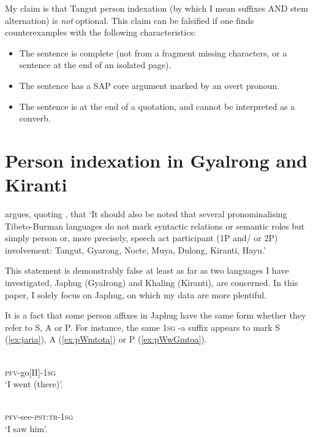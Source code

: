 \documentclass[oldfontcommands,oneside,a4paper,11pt]{article}
\newcommand{\ipa}[1]{{\phon \mbox{#1}}} %
\begin{document}
My claim is that Tangut person indexation (by which I mean suffixes AND stem alternation) is \textit{not} optional. This claim can be falsified if one finds counterexamples with the following characteristics:

\begin{itemize}
\item The sentence is complete (not from a fragment missing characters, or a sentence at the end of an isolated page).
\item The sentence has a SAP core argument marked by an overt pronoun.
\item The sentence is at the end of a quotation, and cannot be interpreted as a converb.
\end{itemize}

\section{Person indexation in Gyalrong and Kiranti} \label{sec:rgyalrong}
\citet[53]{zeisler15eat} argues, quoting \citet[308]{lapolla92}, that `It should also be noted that several pronominalising Tibeto-Burman languages do not mark syntactic relations or semantic roles but simply person or, more precisely, speech act participant (1P and/ or 2P) involvement: Tangut, Gyarong, Nocte, Muya, Dulong, Kiranti, Hayu.'

This statement is demonstrably false at least as far as two languages I have investigated, Japhug (Gyalrong) and Khaling (Kiranti), are concerned. In this paper, I solely focus on Japhug, on which my data are more plentiful.

It is a fact that some person affixes in Japhug have the same form whether they refer to S, A or P. For instance, the same \textsc{1sg} \ipa{-a} suffix appears to mark S (\ref{ex:jaria}), A (\ref{ex:pWmtota}) or P (\ref{ex:pWwGmtoa}).

\begin{exe}
\ex \label{ex:jaria}
\gll \ipa{jɤ-ari-a} \\
\textsc{pfv}-go[II]-\textsc{1sg} \\
\glt `I went (there)'.
\end{exe}

\begin{exe}
\ex \label{ex:pWmtota}
\gll \ipa{pɯ-mto-t-a} \\
\textsc{pfv}-see-\textsc{pst:tr}-\textsc{1sg} \\
\glt `I saw him'.
\end{exe}
\end{document}
